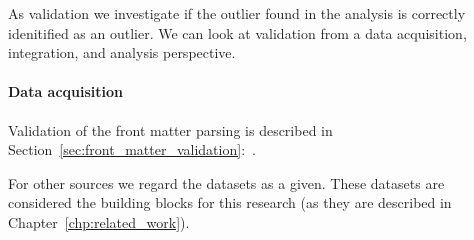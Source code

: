 \documentclass{ou-report}
\newcommand{\outline}[1]{{\color{blue} #1}}
\begin{document}








As validation we investigate if the outlier found in the analysis is correctly 
idenitified as an outlier. We can look at validation from a data acquisition,
integration, and analysis perspective.
\paragraph{Data acquisition}
Validation of the front matter parsing is described in 
Section~\ref{sec:front_matter_validation}:~.

For other sources we regard the datasets as a given. These datasets are 
considered the building blocks for this research (as they are described in 
Chapter~\ref{chp:related_work}).
\end{document}
